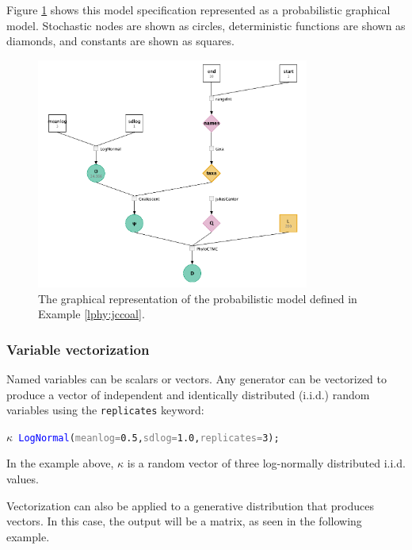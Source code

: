\documentclass[10pt,letterpaper,table]{article}
\theoremstyle{definition}
\begin{document}
Figure \ref{fig:jccoalPGM} shows this model specification represented as a probabilistic graphical model. 
Stochastic nodes are shown as circles, deterministic functions are shown as diamonds, and constants are shown as squares.


\begin{figure}
   \includegraphics[width=0.8\textwidth]{figs_plos/jc.png}
  \caption{The graphical representation of the probabilistic model defined in Example \ref{lphy:jccoal}.} 
  \label{fig:jccoalPGM}
\end{figure}

\subsubsection{Variable vectorization}

Named variables can be scalars or vectors. 
Any generator can be vectorized to produce a vector of independent and identically distributed (i.i.d.) random variables using the \texttt{replicates} keyword:

{\small
\begin{alltt}
    \textcolor{bluishgreen}{\(\kappa\)} ~ \textcolor{blue}{LogNormal}(\textcolor{gray}{meanlog=}\textcolor{constant}{0.5}, \textcolor{gray}{sdlog=}\textcolor{constant}{1.0}, \textcolor{gray}{replicates=}\textcolor{constant}{3});
\end{alltt}
}

In the example above, $\kappa$ is a random vector of three log-normally distributed i.i.d. values.

Vectorization can also be applied to a generative distribution that produces vectors. In this case, the output will be a matrix, as seen in the following example. 
\end{document}
